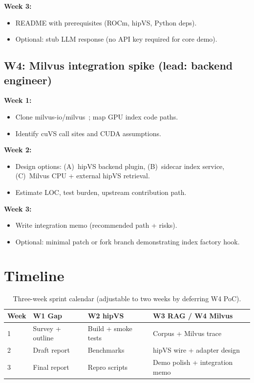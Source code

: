 \documentclass[11pt,a4paper]{article}
\begin{document}
\textbf{Week 3:}
\begin{itemize}[leftmargin=*]
  \item README with prerequisites (ROCm, hipVS, Python deps).
  \item Optional: stub LLM response (no API key required for core demo).
\end{itemize}

\subsection{W4: Milvus integration spike (lead: backend engineer)}

\textbf{Week 1:}
\begin{itemize}[leftmargin=*]
  \item Clone milvus-io/milvus~\cite{milvus-github}; map GPU index code paths.
  \item Identify cuVS call sites and CUDA assumptions.
\end{itemize}

\textbf{Week 2:}
\begin{itemize}[leftmargin=*]
  \item Design options: (A)~hipVS backend plugin, (B)~sidecar index service,
        (C)~Milvus CPU + external hipVS retrieval.
  \item Estimate LOC, test burden, upstream contribution path.
\end{itemize}

\textbf{Week 3:}
\begin{itemize}[leftmargin=*]
  \item Write integration memo (recommended path + risks).
  \item Optional: minimal patch or fork branch demonstrating index factory hook.
\end{itemize}

\section{Timeline}
\label{sec:timeline}

\begin{table}[htbp]
  \centering
  \caption{Three-week sprint calendar (adjustable to two weeks by deferring W4 PoC).}
  \label{tab:timeline}
  \begin{tabular}{@{}llll@{}}
    \toprule
    \textbf{Week} & \textbf{W1 Gap} & \textbf{W2 hipVS} & \textbf{W3 RAG / W4 Milvus} \\
    \midrule
    1 & Survey + outline & Build + smoke tests & Corpus + Milvus trace \\
    2 & Draft report & Benchmarks & hipVS wire + adapter design \\
    3 & Final report & Repro scripts & Demo polish + integration memo \\
    \bottomrule
  \end{tabular}
\end{table}
\end{document}
